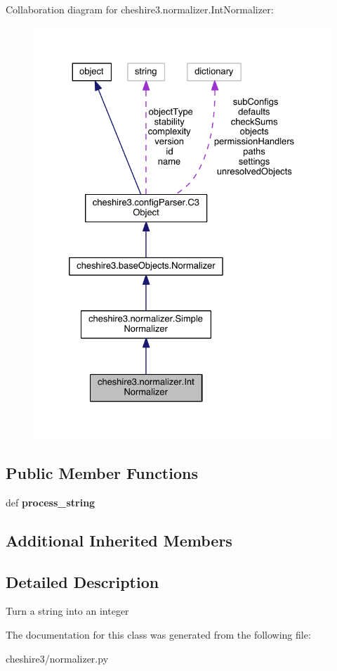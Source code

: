 Collaboration diagram for cheshire3.\-normalizer.\-Int\-Normalizer\-:
\nopagebreak
\begin{figure}[H]
\begin{center}
\leavevmode
\includegraphics[width=328pt]{classcheshire3_1_1normalizer_1_1_int_normalizer__coll__graph}
\end{center}
\end{figure}
\subsection*{Public Member Functions}
\begin{DoxyCompactItemize}
\item 
\hypertarget{classcheshire3_1_1normalizer_1_1_int_normalizer_af587df2aff0700dc48a0c6edc244b3d5}{def {\bfseries process\-\_\-string}}\label{classcheshire3_1_1normalizer_1_1_int_normalizer_af587df2aff0700dc48a0c6edc244b3d5}

\end{DoxyCompactItemize}
\subsection*{Additional Inherited Members}


\subsection{Detailed Description}
\begin{DoxyVerb}Turn a string into an integer \end{DoxyVerb}
 

The documentation for this class was generated from the following file\-:\begin{DoxyCompactItemize}
\item 
cheshire3/normalizer.\-py\end{DoxyCompactItemize}

